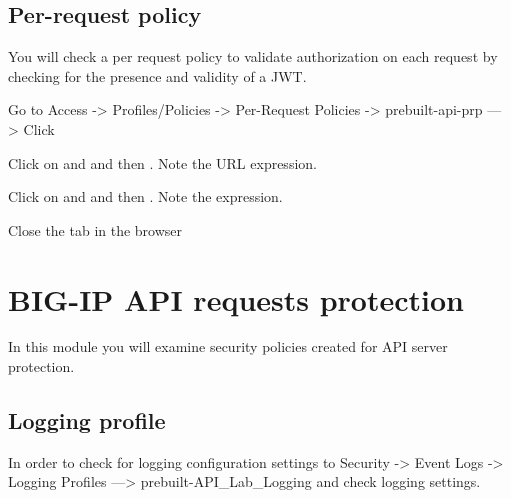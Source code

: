 \documentclass[letterpaper,10pt,english]{sphinxmanual}
\begin{document}
\subsection{Per-request policy}
\label{\detokenize{class2/module1/module1:per-request-policy}}
You will check a per request policy to validate authorization on each request by checking for the presence and validity of a JWT.

Go to Access -\textgreater{} Profiles/Policies -\textgreater{} Per-Request Policies -\textgreater{} prebuilt-api-prp —\textgreater{} Click 
\begin{quote}

\noindent{}
\end{quote}

Click on  and and then . Note the URL expression.
\begin{quote}

\noindent{}
\end{quote}

Click on  and and then . Note the expression.
\begin{quote}

\noindent{}
\end{quote}

Close the tab in the browser


\section{BIG-IP API requests protection}
\label{\detokenize{class2/module2/module2:big-ip-api-requests-protection}}\label{\detokenize{class2/module2/module2::doc}}
In this module you will examine security policies created for API server protection.


\subsection{Logging profile}
\label{\detokenize{class2/module2/module2:logging-profile}}
In order to check for logging configuration settings to Security -\textgreater{} Event Logs -\textgreater{} Logging Profiles —\textgreater{}   prebuilt-API\_Lab\_Logging and check logging settings.
\begin{quote}

\noindent{}
\end{quote}
\end{document}
